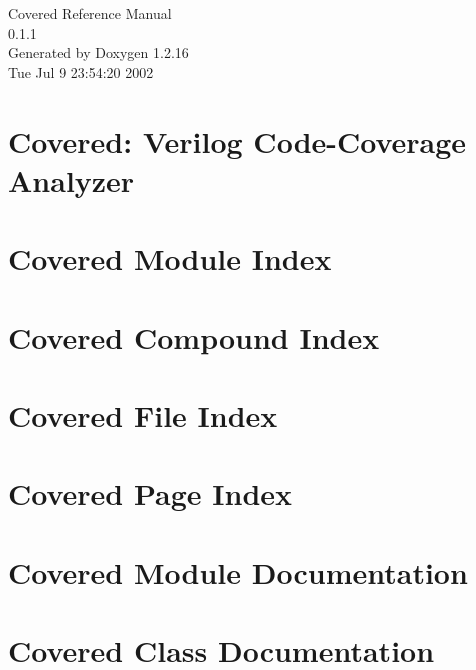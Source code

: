 \documentclass[a4paper]{book}
\begin{document}
\begin{titlepage}
\vspace*{7cm}
\begin{center}
{\Large Covered Reference Manual\\[1ex]\large 0.1.1}\\
\vspace*{1cm}
{\large Generated by Doxygen 1.2.16}\\
\vspace*{0.5cm}
{\small Tue Jul 9 23:54:20 2002}\\
\end{center}
\end{titlepage}
\clearemptydoublepage
{}
\tableofcontents
\clearemptydoublepage
{}
\chapter{Covered: Verilog Code-Coverage Analyzer}
\label{index}
\chapter{Covered Module Index}

\chapter{Covered Compound Index}

\chapter{Covered File Index}

\chapter{Covered Page Index}

\chapter{Covered Module Documentation}










\chapter{Covered Class Documentation}



























\end{document}
